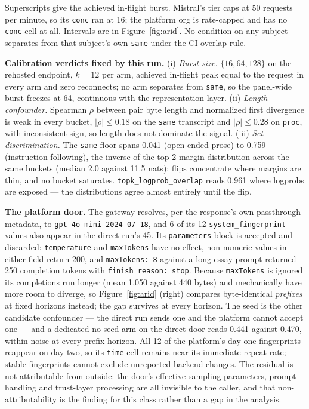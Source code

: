 \documentclass{article}
\begin{document}
Superscripts give the achieved in-flight burst. Mistral's tier caps at 50 requests per minute, so its \texttt{conc} ran at 16; the platform org is rate-capped and has no \texttt{conc} cell at all. Intervals are in Figure~\ref{fig:arid}. No condition on any subject separates from that subject's own \texttt{same} under the CI-overlap rule.

\textbf{Calibration verdicts fixed by this run.} (i) \emph{Burst size.} $\{16,64,128\}$ on the rehosted endpoint, $k=12$ per arm, achieved in-flight peak equal to the request in every arm and zero reconnects; no arm separates from \texttt{same}, so the panel-wide burst freezes at 64, continuous with the representation layer. (ii) \emph{Length confounder.} Spearman $\rho$ between pair byte length and normalized first divergence is weak in every bucket, $|\rho|\le0.18$ on the \texttt{same} transcript and $|\rho|\le0.28$ on \texttt{proc}, with inconsistent sign, so length does not dominate the signal. (iii) \emph{Set discrimination.} The \texttt{same} floor spans 0.041 (open-ended prose) to 0.759 (instruction following), the inverse of the top-2 margin distribution across the same buckets (median 2.0 against 11.5 nats): flips concentrate where margins are thin, and no bucket saturates. \texttt{topk\_logprob\_overlap} reads 0.961 where logprobs are exposed --- the distributions agree almost entirely until the flip.

\textbf{The platform door.} The gateway resolves, per the response's own passthrough metadata, to \texttt{gpt-4o-mini-2024-07-18}, and 6 of its 12 \texttt{system\_fingerprint} values also appear in the direct run's 45. Its \texttt{parameters} block is accepted and discarded: \texttt{temperature} and \texttt{maxTokens} have no effect, non-numeric values in either field return 200, and \texttt{maxTokens: 8} against a long-essay prompt returned 250 completion tokens with \texttt{finish\_reason: stop}. Because \texttt{maxTokens} is ignored its completions run longer (mean 1{,}050 against 440 bytes) and mechanically have more room to diverge, so Figure~\ref{fig:arid} (right) compares byte-identical \emph{prefixes} at fixed horizons instead; the gap survives at every horizon. The seed is the other candidate confounder --- the direct run sends one and the platform cannot accept one --- and a dedicated no-seed arm on the direct door reads 0.441 against 0.470, within noise at every prefix horizon. All 12 of the platform's day-one fingerprints reappear on day two, so its \texttt{time} cell remains near its immediate-repeat rate; stable fingerprints cannot exclude unreported backend changes. The residual is not attributable from outside: the door's effective sampling parameters, prompt handling and trust-layer processing are all invisible to the caller, and that non-attributability is the finding for this class rather than a gap in the analysis.
\end{document}
